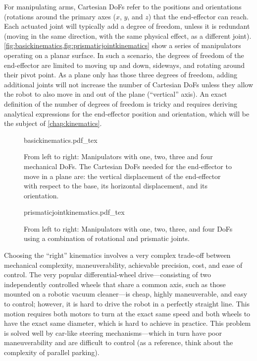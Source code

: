 For manipulating arms, Cartesian DoFs refer to the positions and orientations (rotations around the primary axes ($x$, $y$, and $z$) that the end-effector can reach. Each actuated joint will typically add a degree of freedom, unless it is redundant (moving in the same direction, with the same physical effect, as a different joint). \cref{fig:basickinematics,fig:prismaticjointkinematics} show a series of manipulators operating on a planar surface. In such a scenario, the degrees of freedom of the end-effector are limited to moving up and down, sideways, and rotating around their pivot point. As a plane only has those three degrees of freedom, adding additional joints will not increase the number of Cartesian DoFs unless they allow the robot to also move in and out of the plane (``vertical'' axis).
%
An exact definition of the number of degrees of freedom is tricky and requires deriving analytical expressions for the end-effector position and orientation, which will be the subject of \cref{chap:kinematics}.

\begin{figure}[!htb]
    \centering
    \def\svgwidth{\textwidth}
    {basickinematics.pdf_tex}
    \caption{From left to right: Manipulators with one, two, three and four mechanical DoFs. The Cartesian DoFs needed for the end-effector to move in a plane are: the vertical displacement of the end-effector with respect to the base, its horizontal displacement, and its orientation.}
    \label{fig:basickinematics}
\end{figure}

\begin{figure}[!htb]
    \centering
    \def\svgwidth{\textwidth}
    {prismaticjointkinematics.pdf_tex}
    \caption{From left to right: Manipulators with one, two, three, and four DoFs using a combination of rotational and prismatic joints.}
    \label{fig:prismaticjointkinematics}
\end{figure}

Choosing the ``right'' kinematics involves a very complex trade-off between mechanical complexity, maneuverability, achievable precision, cost, and ease of control. The very popular differential-wheel drive---consisting of two independently controlled wheels that share a common axis, such as those mounted on a robotic vacuum cleaner---is cheap, highly maneuverable, and easy to control; however, it is hard to drive the robot in a perfectly straight line. This motion requires both motors to turn at the exact same speed and both wheels to have the exact same diameter, which is hard to achieve in practice. This problem is solved well by car-like steering mechanisms---which in turn have poor maneuverability and are difficult to control (as a reference, think about the complexity of parallel parking).

